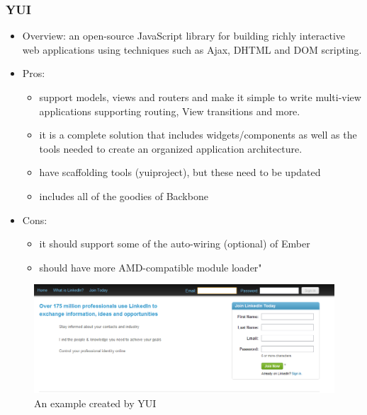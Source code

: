 \documentclass[14pt,a4paper]{extreport}
\begin{document}
		\subsubsection{YUI}
			\begin{itemize}
				\item Overview: an open-source JavaScript library for building richly interactive web applications using techniques such as Ajax, DHTML and DOM scripting.
				\item Pros: 
					\begin{itemize}
						\item support models, views and routers and make it simple to write multi-view applications supporting routing, View transitions and more.
						\item it is a complete solution that includes widgets/components as well as the tools needed to create an organized application architecture.
						\item have scaffolding tools (yuiproject), but these need to be updated
						\item includes all of the goodies of Backbone
					\end{itemize}
				\item Cons:
					\begin{itemize}
						\item it should support some of the auto-wiring (optional) of Ember
						\item should have more AMD-compatible module loader"
					
					\end{itemize}
			\end{itemize}
			\begin{figure}
				\begin{center}
				\includegraphics[scale=0.6]{YUI.png}
				\caption{An example created by YUI}
				\end{center}			
			\end{figure}
\end{document}
